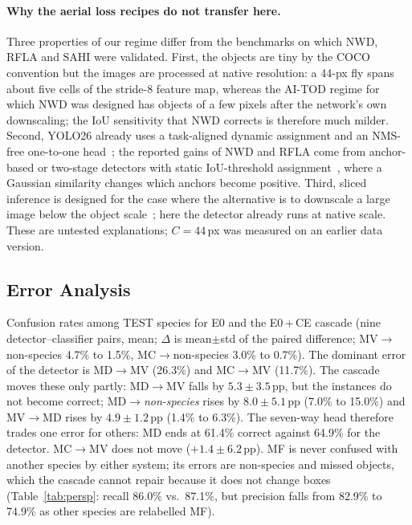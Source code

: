 \paragraph{Why the aerial loss recipes do not transfer here.}
Three properties of our regime differ from the benchmarks on which NWD, RFLA and SAHI were validated. First, the objects are tiny by the COCO convention but the images are processed at native resolution: a 44-px fly spans about five cells of the stride-8 feature map, whereas the AI-TOD regime for which NWD was designed has objects of a few pixels after the network's own downscaling; the IoU sensitivity that NWD corrects is therefore much milder. Second, YOLO26 already uses a task-aligned dynamic assignment and an NMS-free one-to-one head~\cite{yolo26}; the reported gains of NWD and RFLA come from anchor-based or two-stage detectors with static IoU-threshold assignment~\cite{wang2021nwd,xu2022rfla,xu2022aitod}, where a Gaussian similarity changes which anchors become positive. Third, sliced inference is designed for the case where the alternative is to downscale a large image below the object scale~\cite{akyon2022sahi}; here the detector already runs at native scale. These are untested explanations; $C=44$\,px was measured on an earlier data version.

\subsection{Error Analysis}
\label{sec:exp:errors}

Confusion rates among TEST species for E0 and the E0\,+\,CE cascade (nine detector--classifier pairs, mean; $\Delta$ is mean$\pm$std of the paired difference; MV$\to$non-species 4.7\% to 1.5\%, MC$\to$non-species 3.0\% to 0.7\%). The dominant error of the detector is MD$\rightarrow$MV (26.3\%) and MC$\rightarrow$MV (11.7\%). The cascade moves these only partly: MD$\rightarrow$MV falls by $5.3\pm3.5$\,pp, but the instances do not become correct; MD$\rightarrow$\emph{non-species} rises by $8.0\pm5.1$\,pp (7.0\% to 15.0\%) and MV$\rightarrow$MD rises by $4.9\pm1.2$\,pp (1.4\% to 6.3\%). The seven-way head therefore trades one error for others: MD ends at 61.4\% correct against 64.9\% for the detector. MC$\rightarrow$MV does not move ($+1.4\pm6.2$\,pp). MF is never confused with another species by either system; its errors are non-species and missed objects, which the cascade cannot repair because it does not change boxes (Table~\ref{tab:persp}: recall 86.0\% vs.\ 87.1\%, but precision falls from 82.9\% to 74.9\% as other species are relabelled MF). 



